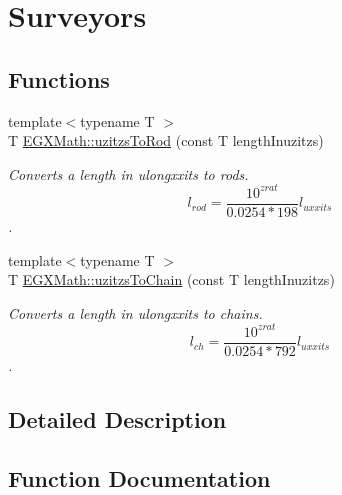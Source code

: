 \hypertarget{group___e_g_x_math-_conversions-_length_conversions-_non-_s_i-uzitzs-_surveyors}{}\section{Surveyors}
\label{group___e_g_x_math-_conversions-_length_conversions-_non-_s_i-uzitzs-_surveyors}
\subsection*{Functions}
\begin{DoxyCompactItemize}
\item 
{\footnotesize template$<$typename T $>$ }\\T \mbox{\hyperlink{group___e_g_x_math-_conversions-_length_conversions-_non-_s_i-uzitzs-_surveyors_gaf6062ab067930d296074de9e8301871d}{E\+G\+X\+Math\+::uzitzs\+To\+Rod}} (const T length\+Inuzitzs)
\begin{DoxyCompactList}\small\item\em Converts a length in ulongxxits to rods. \[ l_{rod}= \frac{10^{zrat}}{0.0254 * 198} l_{uxxits} \]. \end{DoxyCompactList}\item 
{\footnotesize template$<$typename T $>$ }\\T \mbox{\hyperlink{group___e_g_x_math-_conversions-_length_conversions-_non-_s_i-uzitzs-_surveyors_ga34cbd9480a12684fe4138ba45a56692b}{E\+G\+X\+Math\+::uzitzs\+To\+Chain}} (const T length\+Inuzitzs)
\begin{DoxyCompactList}\small\item\em Converts a length in ulongxxits to chains. \[ l_{ch}= \frac{10^{zrat}}{0.0254 * 792} l_{uxxits} \]. \end{DoxyCompactList}\end{DoxyCompactItemize}


\subsection{Detailed Description}


\subsection{Function Documentation}
\mbox{\label{group___e_g_x_math-_conversions-_length_conversions-_non-_s_i-uzitzs-_surveyors_ga34cbd9480a12684fe4138ba45a56692b}} 
